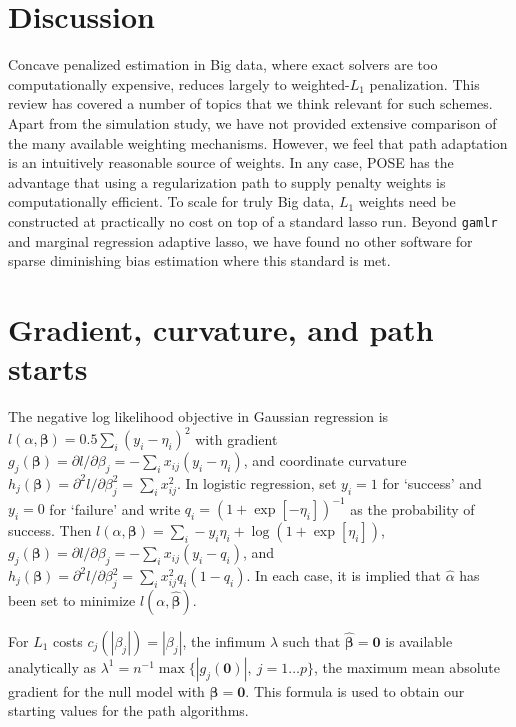 \documentclass[12pt]{article}
\newcommand{\bs}[1]{\boldsymbol{#1}}
\newcommand{\bm}[1]{\mathbf{#1}}
\begin{document}
\section{Discussion}
\label{discussion}


Concave penalized estimation in Big data, where exact solvers are too
computationally expensive, reduces largely to weighted-$L_1$ penalization.
This review has covered a number of topics that we think relevant for such
schemes.  Apart from the simulation study, we have not provided extensive
comparison of the many available weighting mechanisms. However, we feel that
path adaptation is an intuitively reasonable source of weights. In any case,
POSE has the advantage that using a regularization path to supply penalty
weights is computationally efficient. To scale for truly Big data, $L_1$
weights need be constructed at practically no cost on top of a standard lasso
run. Beyond {\tt gamlr} and marginal regression adaptive lasso, we have found
no other software for sparse diminishing bias estimation where this standard
is met.






\appendix
\vskip 1cm

\section{Gradient, curvature, and path starts}
\label{models}

The negative log likelihood objective in Gaussian regression is $
l(\alpha,\bs{\beta}) = 0.5\sum_i (y_i -\eta_i)^2 $ with gradient
$g_j(\bs{\beta}) = \partial l/\partial \beta_j = -\sum_i x_{ij}(y_i -
\eta_i)$, and coordinate curvature $h_j(\bs{\beta}) = \partial^2 l/\partial
\beta_j^2 = \sum_i x_{ij}^2$. In logistic regression, set $y_i = 1$ for
`success' and $y_i = 0$ for `failure' and write $q_i = (1 +
\exp[-\eta_i])^{-1}$ as the probability of success.  Then
$l(\alpha,\bs{\beta}) = \sum_i -y_i\eta_i + \log(1 +
  \exp[\eta_i])$,
$
g_j(\bs{\beta}) = \partial l/\partial \beta_j = -\sum_i
x_{ij}(y_i - q_i)$, and
$h_j(\bs{\beta}) = \partial^2 l/\partial \beta_j^2 = \sum_i
x_{ij}^2q_i(1-q_i)
$.
In each case, it is implied that $\hat\alpha$ has been set
to minimize $l(\alpha,\bs{\hat\beta})$. 

For $L_1$ costs $c_j(|\beta_j|) = |\beta_j|$, the infimum $\lambda$ such
that $\bs{\hat\beta} = \bm{0}$ is  available analytically as
$\lambda^1 =
n^{-1}\max\{|g_j(\bm{0})|,~j=1\ldots p\}$, the maximum mean
absolute gradient for the null model with $\bs{\beta} = \bm{0}$.  This formula
is used to obtain our starting values for the path algorithms.
\end{document}
